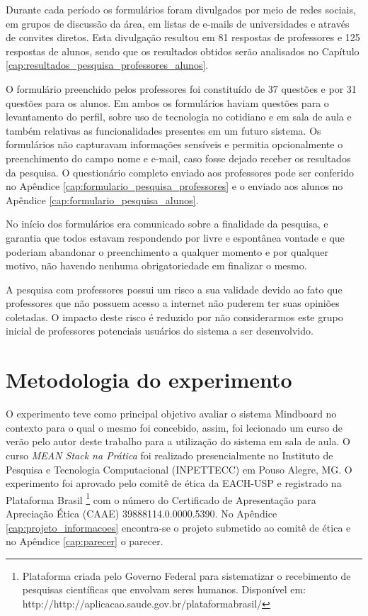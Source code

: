 Durante cada período os formulários foram divulgados por meio de redes sociais, em grupos de discussão da área, em listas de e-mails de universidades e através de convites diretos. Esta divulgação resultou em 81 respostas de professores e 125 respostas de alunos, sendo que os resultados obtidos serão analisados no Capítulo \ref{cap:resultados_pesquisa_professores_alunos}.

O formulário preenchido pelos professores foi constituído de 37 questões e por 31 questões para os alunos. Em ambos os formulários haviam questões para o levantamento do perfil, sobre uso de tecnologia no cotidiano e em sala de aula e também relativas as funcionalidades presentes em um futuro sistema. Os formulários não capturavam informações sensíveis e permitia opcionalmente o preenchimento do campo nome e e-mail, caso fosse dejado receber os resultados da pesquisa. O questionário completo enviado aos professores pode ser conferido no Apêndice \ref{cap:formulario_pesquisa_professores} e o enviado aos alunos no Apêndice \ref{cap:formulario_pesquisa_alunos}.

No início dos formulários era comunicado sobre a finalidade da pesquisa, e  garantia que todos estavam respondendo por livre e espontânea vontade e que poderiam abandonar o preenchimento a qualquer momento e por qualquer motivo, não havendo nenhuma obrigatoriedade em finalizar o mesmo.

A pesquisa com professores possui um risco a sua validade devido ao fato que professores que não possuem acesso a internet não puderem ter suas opiniões coletadas. O impacto deste risco é reduzido por não considerarmos este grupo inicial de professores potenciais usuários do sistema a ser desenvolvido.



\section{Metodologia do experimento}
\label{sec:metodologia_experimento}

O experimento teve como principal objetivo avaliar o sistema Mindboard no contexto para o qual o mesmo foi concebido, assim, foi lecionado um curso de verão pelo autor deste trabalho para a utilização do sistema em sala de aula. O curso \emph{MEAN Stack na Prática} foi realizado presencialmente no Instituto de Pesquisa e Tecnologia Computacional (INPETTECC) em Pouso Alegre, MG. O experimento foi aprovado pelo comitê de ética da EACH-USP e registrado na Plataforma Brasil \footnote{Plataforma criada pelo Governo Federal para sistematizar o recebimento de pesquisas científicas que envolvam seres humanos. Disponível em: http://http://aplicacao.saude.gov.br/plataformabrasil/} com o número do Certificado de Apresentação para Apreciação Ética (CAAE) 39888114.0.0000.5390. No Apêndice \ref{cap:projeto_informacoes} encontra-se o projeto submetido ao comitê de ética e no Apêndice \ref{cap:parecer} o parecer.

